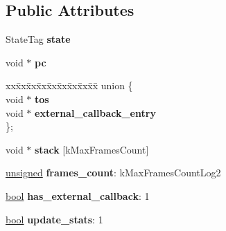 \subsection*{Public Attributes}
\begin{DoxyCompactItemize}
\item 
\mbox{\label{structv8_1_1TickSample_a6ca7bd9445806b92b938eab2e700c324}} 
State\+Tag {\bfseries state}
\item 
\mbox{\label{structv8_1_1TickSample_a33cfc3082f836ce04dfcb97a3691f599}} 
void $\ast$ {\bfseries pc}
\item 
\mbox{\label{structv8_1_1TickSample_af5ce7424155dd71dd815c80f1b0f93f6}} 
\begin{tabbing}
xx\=xx\=xx\=xx\=xx\=xx\=xx\=xx\=xx\=\kill
union \{\\
\>void $\ast$ {\bfseries tos}\\
\>void $\ast$ {\bfseries external\_callback\_entry}\\
\}; \\

\end{tabbing}\item 
\mbox{\label{structv8_1_1TickSample_ae85c9bd6ff1da565d7e3066615a4d450}} 
void $\ast$ {\bfseries stack} \mbox{[}k\+Max\+Frames\+Count\mbox{]}
\item 
\mbox{\label{structv8_1_1TickSample_a00bfe6e03f75c291e220777fe74272d5}} 
\mbox{\hyperlink{classunsigned}{unsigned}} {\bfseries frames\+\_\+count}\+: k\+Max\+Frames\+Count\+Log2
\item 
\mbox{\label{structv8_1_1TickSample_aa7c90f53d4ac6ab23727e21369f70b6e}} 
\mbox{\hyperlink{classbool}{bool}} {\bfseries has\+\_\+external\+\_\+callback}\+: 1
\item 
\mbox{\label{structv8_1_1TickSample_aece17f054264917dcf20fd9ef0616930}} 
\mbox{\hyperlink{classbool}{bool}} {\bfseries update\+\_\+stats}\+: 1
\end{DoxyCompactItemize}

